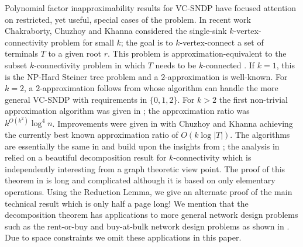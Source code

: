 \documentclass[11pt]{article}
\begin{document}
\smallskip
{} Polynomial
factor inapproximability results for VC-SNDP
\cite{KortsarzKL,ChakCK08} have focused attention on restricted, yet
useful, special cases of the problem. In recent work Chakraborty,
Chuzhoy and Khanna \cite{ChakCK08} considered the single-sink
$k$-vertex-connectivity problem for small $k$; the goal is to
$k$-vertex-connect a set of terminals $T$ to a given root $r$. This
problem is approximation-equivalent to the subset $k$-connectivity
problem in which $T$ needs to be $k$-connected \cite{ChakCK08}.  If
$k=1$, this is the NP-Hard Steiner tree problem and a $2$-approximation
is well-known. For $k=2$, a $2$-approximation follows from
\cite{FleischerJW} whose algorithm can handle the more general VC-SNDP
with requirements in $\{0,1,2\}$. For $k > 2$ the first non-trivial
approximation algorithm was given in \cite{ChakCK08}; the
approximation ratio was $k^{O(k^2)} \log^4 n$. Improvements were given
in \cite{ChuzhoyK08,ChekuriK08} with Chuzhoy and Khanna
\cite{ChuzhoyK08} achieving the currently best known approximation
ratio of $O(k \log |T|)$.  The algorithms are essentially the same in
\cite{ChakCK08,ChuzhoyK08,ChekuriK08} and build upon the insights from
\cite{ChakCK08}; the analysis in \cite{ChuzhoyK08} relied on a
beautiful decomposition result for $k$-connectivity which is
independently interesting from a graph theoretic view point. The proof
of this theorem in \cite{ChuzhoyK08} is long and complicated although
it is based on only elementary operations. Using the Reduction Lemma,
we give an alternate proof of the main technical result which is only
half a page long! We mention that the decomposition theorem has
applications to more general network design problems such as the
rent-or-buy and buy-at-bulk network design problems as shown in
\cite{ChekuriK08}.  Due to space constraints we omit these
applications in this paper.
\end{document}
